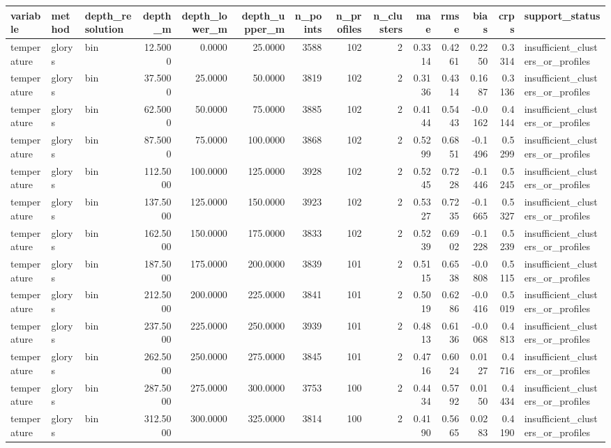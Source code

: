 \begin{tabular}{lllrrrrrrrrrrl}
\toprule
variable & method & depth_resolution & depth_m & depth_lower_m & depth_upper_m & n_points & n_profiles & n_clusters & mae & rmse & bias & crps & support_status \\
\midrule
temperature & glorys & bin & 12.5000 & 0.0000 & 25.0000 & 3588 & 102 & 2 & 0.3314 & 0.4261 & 0.2250 & 0.3314 & insufficient_clusters_or_profiles \\
temperature & glorys & bin & 37.5000 & 25.0000 & 50.0000 & 3819 & 102 & 2 & 0.3136 & 0.4314 & 0.1687 & 0.3136 & insufficient_clusters_or_profiles \\
temperature & glorys & bin & 62.5000 & 50.0000 & 75.0000 & 3885 & 102 & 2 & 0.4144 & 0.5443 & -0.0162 & 0.4144 & insufficient_clusters_or_profiles \\
temperature & glorys & bin & 87.5000 & 75.0000 & 100.0000 & 3868 & 102 & 2 & 0.5299 & 0.6851 & -0.1496 & 0.5299 & insufficient_clusters_or_profiles \\
temperature & glorys & bin & 112.5000 & 100.0000 & 125.0000 & 3928 & 102 & 2 & 0.5245 & 0.7228 & -0.1446 & 0.5245 & insufficient_clusters_or_profiles \\
temperature & glorys & bin & 137.5000 & 125.0000 & 150.0000 & 3923 & 102 & 2 & 0.5327 & 0.7235 & -0.1665 & 0.5327 & insufficient_clusters_or_profiles \\
temperature & glorys & bin & 162.5000 & 150.0000 & 175.0000 & 3833 & 102 & 2 & 0.5239 & 0.6902 & -0.1228 & 0.5239 & insufficient_clusters_or_profiles \\
temperature & glorys & bin & 187.5000 & 175.0000 & 200.0000 & 3839 & 101 & 2 & 0.5115 & 0.6538 & -0.0808 & 0.5115 & insufficient_clusters_or_profiles \\
temperature & glorys & bin & 212.5000 & 200.0000 & 225.0000 & 3841 & 101 & 2 & 0.5019 & 0.6286 & -0.0416 & 0.5019 & insufficient_clusters_or_profiles \\
temperature & glorys & bin & 237.5000 & 225.0000 & 250.0000 & 3939 & 101 & 2 & 0.4813 & 0.6136 & -0.0068 & 0.4813 & insufficient_clusters_or_profiles \\
temperature & glorys & bin & 262.5000 & 250.0000 & 275.0000 & 3845 & 101 & 2 & 0.4716 & 0.6024 & 0.0127 & 0.4716 & insufficient_clusters_or_profiles \\
temperature & glorys & bin & 287.5000 & 275.0000 & 300.0000 & 3753 & 100 & 2 & 0.4434 & 0.5792 & 0.0150 & 0.4434 & insufficient_clusters_or_profiles \\
temperature & glorys & bin & 312.5000 & 300.0000 & 325.0000 & 3814 & 100 & 2 & 0.4190 & 0.5665 & 0.0283 & 0.4190 & insufficient_clusters_or_profiles \\

\end{tabular}
